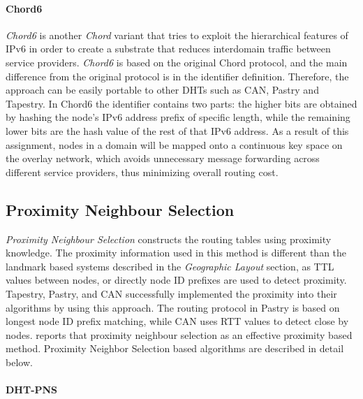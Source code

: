 \documentclass[acmcsur]{acmtrans2m}
\begin{document}
\paragraph*{\bf Chord6}
\emph{Chord6} \cite{xiong_chord6_2005} is another \textit{Chord} variant that
tries to exploit the hierarchical features of IPv6 in order to create a
substrate that reduces interdomain traffic between service providers.
\textit{Chord6} is based on the original Chord protocol, and the main difference
from the original protocol is in the identifier definition. Therefore, the
approach can be easily portable to other DHTs such as CAN, Pastry and Tapestry.
In Chord6 the identifier contains two parts: the higher bits are obtained by
hashing the node's IPv6 address prefix of specific length, while the remaining
lower bits are the hash value of the rest of that IPv6 address. As a result of
this assignment, nodes in a domain will be mapped onto a continuous key space on
the overlay network, which avoids unnecessary message forwarding across
different service providers, thus minimizing overall routing cost. 


\subsection{Proximity Neighbour Selection}\label{sec:pns}
\textit{Proximity Neighbour Selection} constructs the routing tables using proximity
knowledge. The proximity information used in this method is different than the
landmark based systems described in the \textit{Geographic Layout} section, as TTL values between
nodes, or directly node ID prefixes are used to detect proximity.  Tapestry,
Pastry, and CAN successfully implemented the proximity into their algorithms by
using this approach.  The routing protocol in Pastry is based on longest node ID
prefix matching, while CAN uses RTT values to detect close by nodes.
\cite{castro_proximityp2p_2002}  reports that proximity neighbour selection as
an effective proximity based method.
%
Proximity Neighbor Selection based algorithms are described in detail below.


\paragraph*{\bf DHT-PNS}
\end{document}
